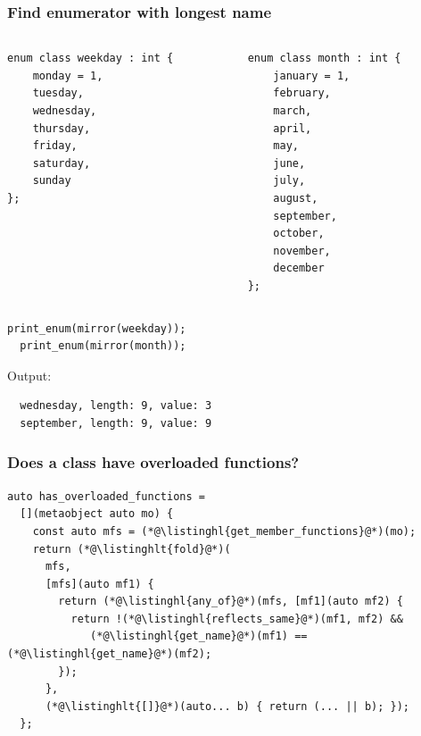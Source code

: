 \documentclass[compress,table,xcolor=table]{beamer}
\begin{document}
\begin{frame}[fragile]
  \frametitle{Find enumerator with longest name}
  \begin{columns}
    \begin{column}{.45\textwidth}
      \begin{lstlisting}[language=c++2x,basicstyle=\scriptsize\ttfamily]
enum class weekday : int {
    monday = 1,
    tuesday,
    wednesday,
    thursday,
    friday,
    saturday,
    sunday
};
      \end{lstlisting}
    \end{column}
    \begin{column}{.45\textwidth}
      \begin{lstlisting}[language=c++2x,basicstyle=\tiny\ttfamily]
enum class month : int {
    january = 1,
    february,
    march,
    april,
    may,
    june,
    july,
    august,
    september,
    october,
    november,
    december
};
      \end{lstlisting}
    \end{column}
  \end{columns}
  \begin{lstlisting}[language=c++2x]
  print_enum(mirror(weekday));
  print_enum(mirror(month));
  \end{lstlisting}
  Output:
  \begin{verbatim}
  wednesday, length: 9, value: 3
  september, length: 9, value: 9
  \end{verbatim}
\end{frame}
\begin{frame}[fragile]
  \frametitle{Does a class have overloaded functions?}
  \begin{lstlisting}[language=c++2x,basicstyle=\footnotesize\ttfamily]
auto has_overloaded_functions =
  [](metaobject auto mo) {
    const auto mfs = (*@\listinghl{get_member_functions}@*)(mo);
    return (*@\listinghlt{fold}@*)(
      mfs,
      [mfs](auto mf1) {
        return (*@\listinghl{any_of}@*)(mfs, [mf1](auto mf2) {
          return !(*@\listinghl{reflects_same}@*)(mf1, mf2) &&
             (*@\listinghl{get_name}@*)(mf1) == (*@\listinghl{get_name}@*)(mf2);
        });
      },
      (*@\listinghlt{[]}@*)(auto... b) { return (... || b); });
  };
  \end{lstlisting}
\end{frame}
\end{document}
